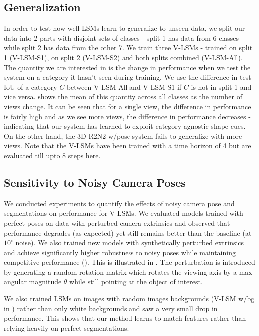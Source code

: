 \documentclass[../thesis.tex]{subfiles}
\begin{document}
\subsection{Generalization}
In order to test how well LSMs learn to generalize to unseen data, we split our data into 2 parts with disjoint sets of classes - split 1 has data from 6 classes while split 2 has data from the other 7. We train three V-LSMs - trained on split 1 (V-LSM-S1), on split 2 (V-LSM-S2) and both splits combined (V-LSM-All). The quantity we are interested in is the change in performance when we test the system on a category it hasn't seen during training. We use the difference in test IoU of a category $C$ between V-LSM-All and V-LSM-S1 if $C$ is not in split 1 and vice versa.  shows the mean of this quantity across all classes as the number of views change. It can be seen that for a single view, the difference in performance is fairly high and as we see more views, the difference in performance decreases - indicating that our system has learned to exploit category agnostic shape cues. On the other hand, the 3D-R2N2 w/pose system fails to generalize with more views. Note that the V-LSMs have been trained with a time horizon of 4 but are evaluated till upto 8 steps here.

\subsection{Sensitivity to Noisy Camera Poses}

We conducted experiments to quantify the effects of noisy camera pose and segmentations on performance for V-LSMs. We evaluated models trained with perfect poses on data with perturbed camera extrinsics and observed that performance degrades (as expected) yet still remains better than the baseline (at $10^\circ$  noise). We also trained new models with synthetically perturbed extrinsics and achieve significantly higher robustness to noisy poses while maintaining competitive performance (). This is illustrated in . The perturbation is introduced by generating a random rotation matrix which rotates the viewing axis by a max angular magnitude $\theta$ while still pointing at the object of interest.

We also trained LSMs on images with random images backgrounds (V-LSM w/bg in ) rather than only white backgrounds and saw a very small drop in performance. This shows that our method learns to match features rather than relying heavily on perfect segmentations.
\end{document}
